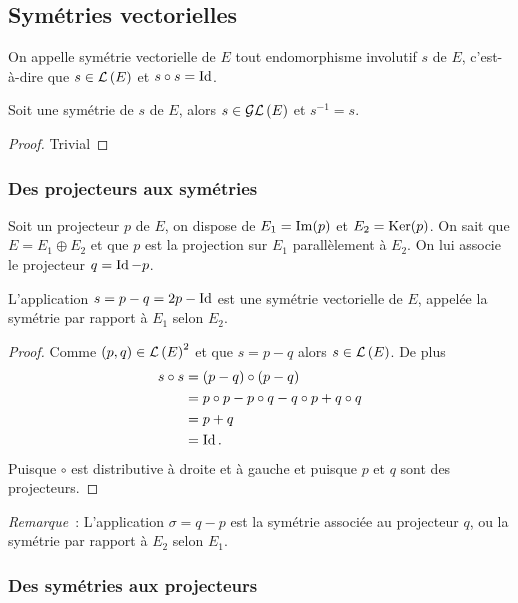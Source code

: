 \subsection{Symétries vectorielles}

\begin{defdef}
  On appelle symétrie vectorielle de \(E\) tout endomorphisme involutif \(s\) de \(E\), c'est-à-dire que \(s \in \mathcal{L}\left(E\right)\) et \(s \circ s = \operatorname{Id}\).
\end{defdef}

\begin{prop}
  Soit une symétrie de \(s\) de \(E\), alors \(s \in \mathcal{GL}\left(E\right)\) et \(s^{-1}=s\).
\end{prop}
\begin{proof}
  Trivial
\end{proof}

\subsubsection{Des projecteurs aux symétries}

Soit un projecteur \(p\) de \(E\), on dispose de \(E_1=\operatorname{Im}(p)\) et \(E_2=\operatorname{Ker}(p)\). On sait que \(E=E_1 \oplus E_2\) et que \(p\) est la projection sur \(E_1\) parallèlement à \(E_2\). On lui associe le projecteur \(q=\operatorname{Id}-p\).

\begin{prop}
  L'application \(s=p-q=2p-\operatorname{Id}\) est une symétrie vectorielle de \(E\), appelée la symétrie par rapport à \(E_1\) selon \(E_2\).
\end{prop}
\begin{proof}
  Comme \((p,q) \in \mathcal{L}\left(E\right)^2\) et que \(s=p-q\) alors \(s \in \mathcal{L}\left(E\right)\). De plus
  \begin{align}
    s \circ s &=(p-q) \circ (p-q)\\
    &=p \circ p -p \circ q -q \circ p +q \circ q\\
    &=p+q\\
    &=\operatorname{Id}.
  \end{align}
  Puisque \(\circ\) est distributive à droite et à gauche et puisque \(p\) et \(q\) sont des projecteurs.
\end{proof}

\emph{Remarque}~: L'application \(\sigma=q-p\) est la symétrie associée au projecteur \(q\), ou la symétrie par rapport à \(E_2\) selon \(E_1\).

\subsubsection{Des symétries aux projecteurs}

